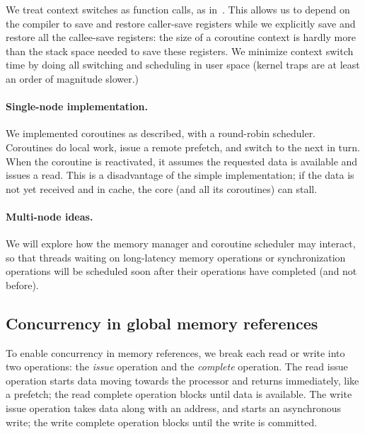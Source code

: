 \documentclass[10pt,nocopyrightspace,preprint]{sigplanconf}
\begin{document}
We treat context switches as function calls, as in~\cite{charm}. This allows us 
to depend on the compiler to save and restore caller-save registers while we explicitly save and restore all the callee-save registers:  the size of a coroutine context is hardly more than the stack space needed to save these registers.  We minimize
context switch time by doing all switching and scheduling in user space (kernel traps are at least an order of magnitude slower.)

\paragraph{Single-node implementation.}  We implemented coroutines
as described, with a round-robin scheduler. Coroutines do local work,
issue a remote prefetch, and switch to the next in turn.  When the
coroutine is reactivated, it assumes the requested data is available
and issues a read.  This is a disadvantage of the simple
implementation; if the data is not yet received and in cache, the core
(and all its coroutines) can stall.

\paragraph{Multi-node ideas.}
We will explore how the memory manager and coroutine scheduler may
interact, so that threads waiting on long-latency memory operations or
synchronization operations will be scheduled soon after their
operations have completed (and not before).

\subsection{Concurrency in global memory references}

To enable concurrency in memory references, we break each read or
write into two operations: the {\em issue} operation and the {\em
  complete} operation. The read issue operation starts data moving
towards the processor and returns immediately, like a prefetch; the
read complete operation blocks until data is available. The write
issue operation takes data along with an address, and starts an
asynchronous write; the write complete operation blocks until the
write is committed.
\end{document}
